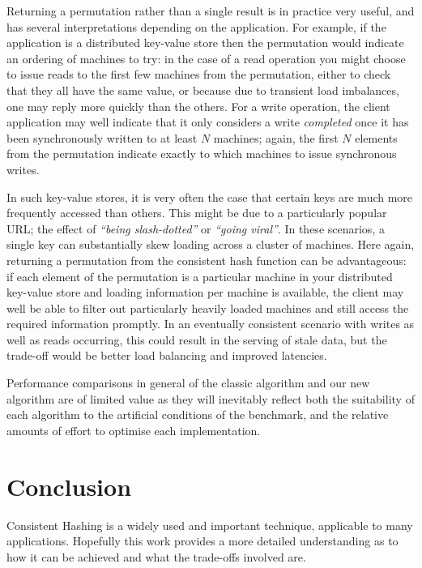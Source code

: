\documentclass[runningheads,a4paper]{llncs}
\begin{document}
Returning a permutation rather than a single result is in practice
very useful, and has several interpretations depending on the
application. For example, if the application is a distributed
key-value store then the permutation would indicate an ordering of
machines to try: in the case of a read operation you might choose to
issue reads to the first few machines from the permutation, either to
check that they all have the same value, or because due to transient
load imbalances, one may reply more quickly than the others. For a
write operation, the client application may well indicate that it only
considers a write {\em completed} once it has been synchronously
written to at least $N$ machines; again, the first $N$ elements from
the permutation indicate exactly to which machines to issue
synchronous writes.

In such key-value stores, it is very often the case that certain keys
are much more frequently accessed than others. This might be due to a
particularly popular URL; the effect of {\em ``being slash-dotted''}
or {\em ``going viral''}. In these scenarios, a single key can
substantially skew loading across a cluster of machines. Here again,
returning a permutation from the consistent hash function can be
advantageous: if each element of the permutation is a particular
machine in your distributed key-value store and loading information
per machine is available, the client may well be able to filter out
particularly heavily loaded machines and still access the required
information promptly. In an eventually consistent scenario with writes
as well as reads occurring, this could result in the serving of stale
data, but the trade-off would be better load balancing and improved
latencies.

Performance comparisons in general of the classic algorithm and our
new algorithm are of limited value as they will inevitably reflect
both the suitability of each algorithm to the artificial conditions of
the benchmark, and the relative amounts of effort to optimise each
implementation.

\section{Conclusion}

Consistent Hashing is a widely used and important technique,
applicable to many applications. Hopefully this work provides a more
detailed understanding as to how it can be achieved and what the
trade-offs involved are.
\end{document}
